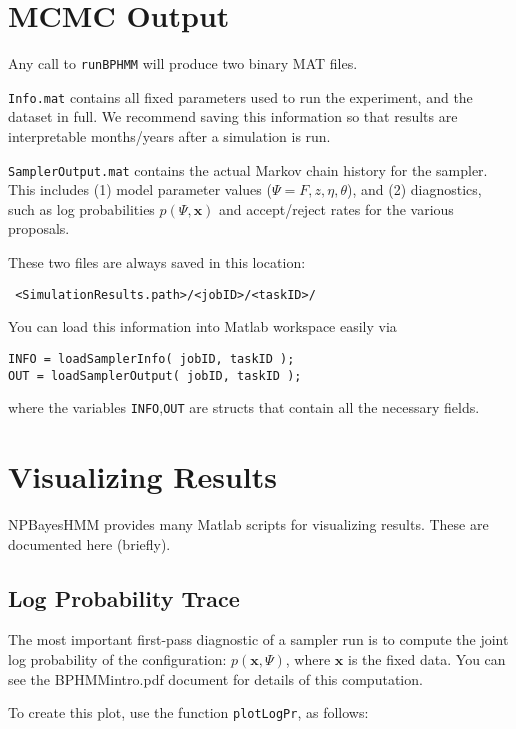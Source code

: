 \documentclass[fontsize=12]{article}
\begin{document}
\section{ MCMC Output }

Any call to \texttt{runBPHMM} will produce two binary MAT files.

 \texttt{Info.mat} contains all fixed parameters used to run the experiment, and the dataset in full.  We recommend saving this information so that results are interpretable months/years after a simulation is run.
 
 \texttt{SamplerOutput.mat} contains the actual Markov chain history for the sampler.  This includes (1) model parameter values ($\Psi = F,z, \eta, \theta$), and (2) diagnostics, such as log probabilities $p( \Psi , \mathbf{x} )$ and accept/reject rates for the various proposals.

These two files are always saved in this location:

\texttt{ <SimulationResults.path>/<jobID>/<taskID>/ }

You can load this information into Matlab workspace easily via

\begin{verbatim}
INFO = loadSamplerInfo( jobID, taskID );
OUT = loadSamplerOutput( jobID, taskID );
\end{verbatim}

where the variables \texttt{INFO},\texttt{OUT} are structs that contain all the necessary fields.


\section{ Visualizing Results }

NPBayesHMM provides many Matlab scripts for visualizing results. These are documented here (briefly).

\subsection{ Log Probability Trace }

The most important first-pass diagnostic of a sampler run is to compute the joint log probability of the configuration: $p( \mathbf{x}, \Psi)$, where $\mathbf{x}$ is the fixed data.  You can see the BPHMMintro.pdf document for details of this computation.  

To create this plot, use the function \texttt{plotLogPr}, as follows:
\end{document}
